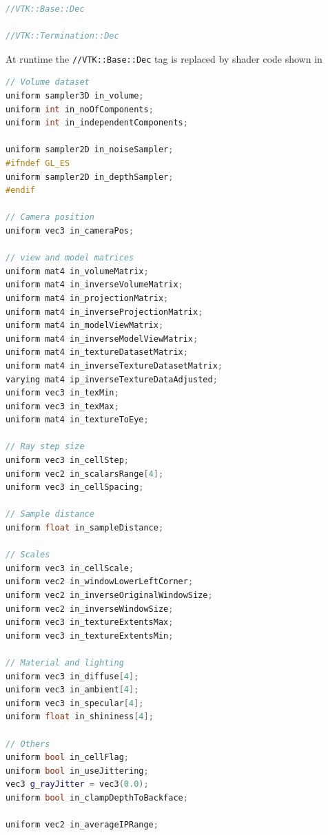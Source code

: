 \begin{lstlisting}[language=C++, caption={Fragment shader tags},
                   captionpos=b, frame=single, breaklines=true,
                   label=lst:skeletonshader]
//VTK::Base::Dec

//VTK::Termination::Dec

\end{lstlisting}

At runtime the \texttt{//VTK::Base::Dec} tag is replaced by shader code
shown in~

\begin{lstlisting}[language=C++, caption={Base declaration fragment code},
                   captionpos=b, frame=single, breaklines=true,
                   label=lst:basedeclshader]
// Volume dataset
uniform sampler3D in_volume;
uniform int in_noOfComponents;
uniform int in_independentComponents;

uniform sampler2D in_noiseSampler;
#ifndef GL_ES
uniform sampler2D in_depthSampler;
#endif

// Camera position
uniform vec3 in_cameraPos;

// view and model matrices
uniform mat4 in_volumeMatrix;
uniform mat4 in_inverseVolumeMatrix;
uniform mat4 in_projectionMatrix;
uniform mat4 in_inverseProjectionMatrix;
uniform mat4 in_modelViewMatrix;
uniform mat4 in_inverseModelViewMatrix;
uniform mat4 in_textureDatasetMatrix;
uniform mat4 in_inverseTextureDatasetMatrix;
varying mat4 ip_inverseTextureDataAdjusted;
uniform vec3 in_texMin;
uniform vec3 in_texMax;
uniform mat4 in_textureToEye;

// Ray step size
uniform vec3 in_cellStep;
uniform vec2 in_scalarsRange[4];
uniform vec3 in_cellSpacing;

// Sample distance
uniform float in_sampleDistance;

// Scales
uniform vec3 in_cellScale;
uniform vec2 in_windowLowerLeftCorner;
uniform vec2 in_inverseOriginalWindowSize;
uniform vec2 in_inverseWindowSize;
uniform vec3 in_textureExtentsMax;
uniform vec3 in_textureExtentsMin;

// Material and lighting
uniform vec3 in_diffuse[4];
uniform vec3 in_ambient[4];
uniform vec3 in_specular[4];
uniform float in_shininess[4];

// Others
uniform bool in_cellFlag;
uniform bool in_useJittering;
vec3 g_rayJitter = vec3(0.0);
uniform bool in_clampDepthToBackface;

uniform vec2 in_averageIPRange;
\end{lstlisting}

